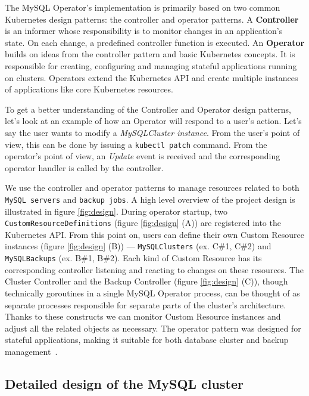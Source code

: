 The MySQL Operator’s implementation is primarily based on two common Kubernetes design patterns:
the controller and operator patterns. A \textbf{Controller} is an informer whose responsibility is
to monitor changes in an application’s state. On each change, a predefined controller function is
executed. An \textbf{Operator} builds on ideas from the controller pattern and basic Kubernetes
concepts. It is responsible for creating, configuring and managing stateful applications running on
clusters. Operators extend the Kubernetes API and create multiple instances of applications like
core Kubernetes resources.

To get a better understanding of the Controller and Operator design patterns, let’s look at an
example of how an Operator will respond to a user’s action. Let’s say the user wants to modify a
\textit{MySQLCluster instance}. From the user’s point of view, this can be done by issuing a
\texttt{kubectl patch} command. From the operator’s point of view, an \textit{Update} event is
received and the corresponding operator handler is called by the controller.

We use the controller and operator patterns to manage resources related to both 
\texttt{MySQL servers} and \texttt{backup jobs}. A high level overview of the project design is
illustrated in figure \ref{fig:design}. During operator startup, two
\texttt{CustomResourceDefinitions} (figure \ref{fig:design} (A)) are registered into the Kubernetes API.
From this point on, users can define their own Custom Resource instances (figure \ref{fig:design} (B)) ---
\texttt{MySQLClusters} (ex. C\#1, C\#2) and \texttt{MySQLBackups} (ex. B\#1, B\#2). Each kind of
Custom Resource has its corresponding controller listening and reacting to changes on these
resources. The Cluster Controller and the Backup Controller (figure \ref{fig:design} (C)), though technically
goroutines in a single MySQL Operator process, can be thought of as separate processes responsible
for separate parts of the cluster’s architecture. Thanks to these constructs we can monitor Custom
Resource instances and adjust all the related objects as necessary. The operator pattern was
designed for stateful applications, making it suitable for both database cluster and backup
management~\cite{coreos}.

\subsection{Detailed design of the MySQL cluster}

